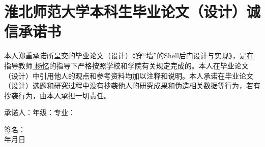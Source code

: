 \chapter*{淮北师范大学本科生毕业论文（设计）诚信承诺书}
\begin{doublespace}

{\sanhao {}
	
	本人郑重承诺所呈交的毕业论文（设计）《\quad 穿“墙”的Shell后门设计与实现\quad 》，是在指导教师\underline{ \quad 杨忆\quad }的指导下严格按照学校和学院有关规定完成的。本人在毕业论文（设计）中引用他人的观点和参考资料均加以注释和说明。本人承诺在毕业论文（设计）选题和研究过程中没有抄袭他人的研究成果和伪造相关数据等行为，若有抄袭行为，由本人承担一切责任。
	
	\vspace{80pt}
	承诺人：\qquad \qquad 年级：\qquad \qquad 专业：\qquad \qquad
	\vspace{60pt}
	
	\hfill 签名：\hspace*{10cm}\\
	
	\vspace{30pt} 
	\hfill 年\hspace{26pt}月\hspace{26pt}日\hspace*{2cm}
}	
\end{doublespace}

